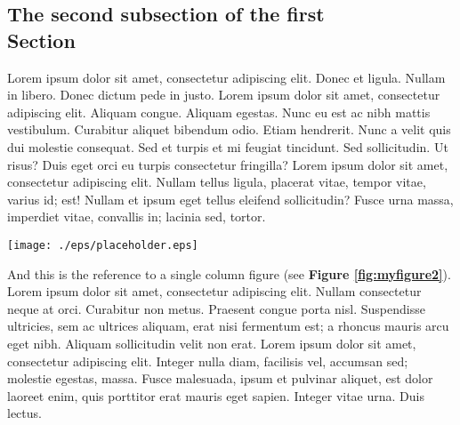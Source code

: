 \subsection{The second subsection of the first \\ Section}

Lorem ipsum dolor sit amet, consectetur adipiscing elit. Donec et ligula. Nullam
in libero. Donec dictum pede in justo. Lorem ipsum dolor sit amet, consectetur
adipiscing elit. Aliquam congue. Aliquam egestas. Nunc eu est ac nibh mattis
vestibulum. Curabitur aliquet bibendum odio. Etiam hendrerit. Nunc a velit quis
dui molestie consequat. Sed et turpis et mi feugiat tincidunt. Sed sollicitudin.
Ut risus? Duis eget orci eu turpis consectetur fringilla? Lorem ipsum dolor sit
amet, consectetur adipiscing elit. Nullam tellus ligula, placerat vitae, tempor
vitae, varius id; est! Nullam et ipsum eget tellus eleifend sollicitudin? Fusce
urna massa, imperdiet vitae, convallis in; lacinia sed, tortor.

\begin{figure*}[t]
  \centering
 \texttt{[image: ./eps/placeholder.eps]}
 \caption{Some wide-figure caption.}
 \label{fig:myfigure2}
\end{figure*}

And this is the reference to a single column figure (see {\bf Figure
\ref{fig:myfigure2}}). Lorem ipsum dolor sit amet, consectetur adipiscing elit.
Nullam consectetur neque at orci. Curabitur non metus. Praesent congue porta
nisl. Suspendisse ultricies, sem ac ultrices aliquam, erat nisi fermentum est; a
rhoncus mauris arcu eget nibh. Aliquam sollicitudin velit non erat. Lorem ipsum
dolor sit amet, consectetur adipiscing elit. Integer nulla diam, facilisis vel,
accumsan sed; molestie egestas, massa. Fusce malesuada, ipsum et pulvinar
aliquet, est dolor laoreet enim, quis porttitor erat mauris eget sapien. Integer
vitae urna. Duis lectus.

